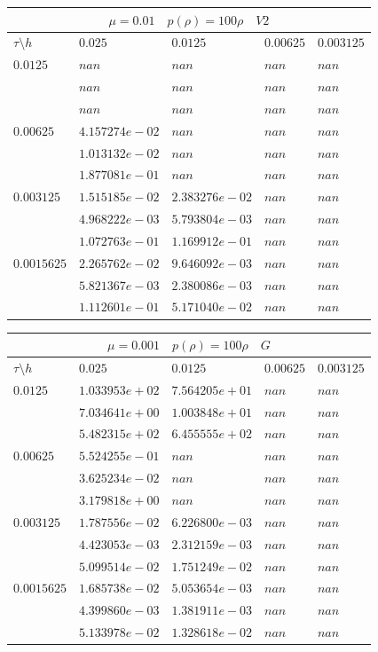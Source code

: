 \documentclass[a4paper,12pt]{extarticle}
\begin{document}
\begin{tabular}{|l|l|l|l|l|}
	\hline
	\multicolumn{5}{|c|}{$\mu =0.01 \quad  p(\rho) =100 \rho \quad V2$}\\
	\hline
	$\tau\setminus h$ & $0.025$ & $0.0125$ & $0.00625$ & $0.003125$\\
	\hline
	$0.0125$  & $nan$ & $nan$ & $nan$ & $nan$\\
	& $nan$ & $nan$ & $nan$ & $nan$\\
	& $nan$ & $nan$ & $nan$ & $nan$\\
	\hline
	$0.00625$  & $4.157274e-02$ & $nan$ & $nan$ & $nan$\\
	& $1.013132e-02$ & $nan$ & $nan$ & $nan$\\
	& $1.877081e-01$ & $nan$ & $nan$ & $nan$\\
	\hline
	$0.003125$  & $1.515185e-02$ & $2.383276e-02$ & $nan$ & $nan$\\
	& $4.968222e-03$ & $5.793804e-03$ & $nan$ & $nan$\\
	& $1.072763e-01$ & $1.169912e-01$ & $nan$ & $nan$\\
	\hline
	$0.0015625$  & $2.265762e-02$ & $9.646092e-03$ & $nan$ & $nan$\\
	& $5.821367e-03$ & $2.380086e-03$ & $nan$ & $nan$\\
	& $1.112601e-01$ & $5.171040e-02$ & $nan$ & $nan$\\
	\hline
\end{tabular}

\begin{tabular}{|l|l|l|l|l|}
	\hline
	\multicolumn{5}{|c|}{$\mu =0.001 \quad  p(\rho) =100 \rho \quad G$}\\
	\hline
	$\tau\setminus h$ & $0.025$ & $0.0125$ & $0.00625$ & $0.003125$\\
	\hline
	$0.0125$  & $1.033953e+02$ & $7.564205e+01$ & $nan$ & $nan$\\
	& $7.034641e+00$ & $1.003848e+01$ & $nan$ & $nan$\\
	& $5.482315e+02$ & $6.455555e+02$ & $nan$ & $nan$\\
	\hline
	$0.00625$  & $5.524255e-01$ & $nan$ & $nan$ & $nan$\\
	& $3.625234e-02$ & $nan$ & $nan$ & $nan$\\
	& $3.179818e+00$ & $nan$ & $nan$ & $nan$\\
	\hline
	$0.003125$  & $1.787556e-02$ & $6.226800e-03$ & $nan$ & $nan$\\
	& $4.423053e-03$ & $2.312159e-03$ & $nan$ & $nan$\\
	& $5.099514e-02$ & $1.751249e-02$ & $nan$ & $nan$\\
	\hline
	$0.0015625$  & $1.685738e-02$ & $5.053654e-03$ & $nan$ & $nan$\\
	& $4.399860e-03$ & $1.381911e-03$ & $nan$ & $nan$\\
	& $5.133978e-02$ & $1.328618e-02$ & $nan$ & $nan$\\
	\hline
\end{tabular}
\end{document}
